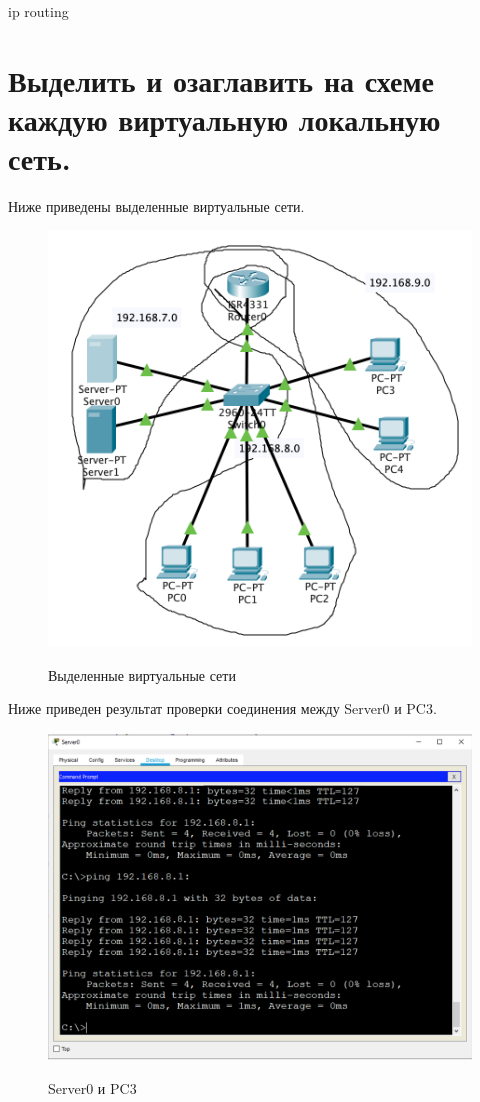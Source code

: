 \documentclass[a4paper,12pt]{article}
\begin{document}
	ip routing
	
	
	\section{Выделить и озаглавить на схеме каждую виртуальную локальную сеть.}
	
	Ниже приведены выделенные виртуальные сети.
	
	\newpage
	
	\begin{figure}[h!]
		\begin{center}
			{\includegraphics[scale = 0.45]{img/1.png}}
			\caption{Выделенные виртуальные сети}
			\label{ris:5}
		\end{center}
	\end{figure}

	Ниже приведен результат проверки соединения между Server0 и PC3.

	\begin{figure}[h!]
		\begin{center}
			{\includegraphics[scale = 0.45]{img/4.png}}
			\caption{Server0 и PC3}
			\label{ris:6}
		\end{center}
	\end{figure}
\end{document}
